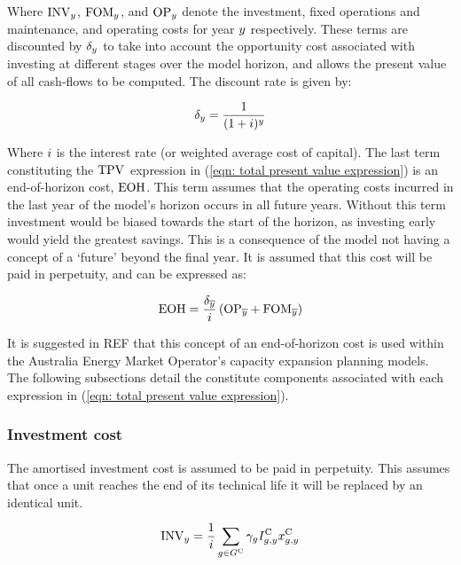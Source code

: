 \documentclass{article}
\begin{document}
Where $\cInvestmentCost$, $\cFixedOperationsMaintenanceCost$, and $\cOperatingCost[\iYear]$ denote the investment, fixed operations and maintenance, and operating costs for year $\iYear$ respectively. These terms are discounted by $\cDiscountRate$ to take into account the opportunity cost associated with investing at different stages over the model horizon, and allows the present value of all cash-flows to be computed. The discount rate is given by:

\begin{equation}
\cDiscountRate = \frac{1}{(1 + \cInterestRate)^{\iYear}}
\end{equation}

Where $\cInterestRate$ is the interest rate (or weighted average cost of capital). The last term constituting the $\cTotalPresentValue$ expression in (\ref{eqn: total present value expression}) is an end-of-horizon cost, $\cEndOfHorizonCost$. This term assumes that the operating costs incurred in the last year of the model's horizon occurs in all future years. Without this term investment would be biased towards the start of the horizon, as investing early would yield the greatest savings. This is a consequence of the model not having a concept of a `future' beyond the final year. It is assumed that this cost will be paid in perpetuity, and can be expressed as:

\begin{equation}
\cEndOfHorizonCost = \frac{\cDiscountRate[\iYearTerminal]}{\cInterestRate} 
\left(
\cOperatingCost[\iYearTerminal] 
+ 
\cFixedOperationsMaintenanceCost[\iYearTerminal] 
\right)
\end{equation}

It is suggested in REF that this concept of an end-of-horizon cost is used within the Australia Energy Market Operator's capacity expansion planning models. The following subsections detail the constitute components associated with each expression in (\ref{eqn: total present value expression}).

\subsubsection{Investment cost}
The amortised investment cost is assumed to be paid in perpetuity. This assumes that once a unit reaches the end of its technical life it will be replaced by an identical unit.

\begin{equation}
\cInvestmentCost = \frac{1}{\cInterestRate}\sum\limits_{g\in \sGeneratorsCandidate} \cAmortisationRate  \cCandidateInvestmentCost \vInstalledCapacity
\end{equation}
\end{document}
